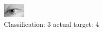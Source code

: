 \begin{figure}[h!]
\begin{center}
\includegraphics[width=0.60\columnwidth]{figures/ID2952_class_3_target_4.png}
\end{center}
\caption{ Classification: 3 actual target: 4}
\label{fig:ID2952_class_3_target_4}
\end{figure}
